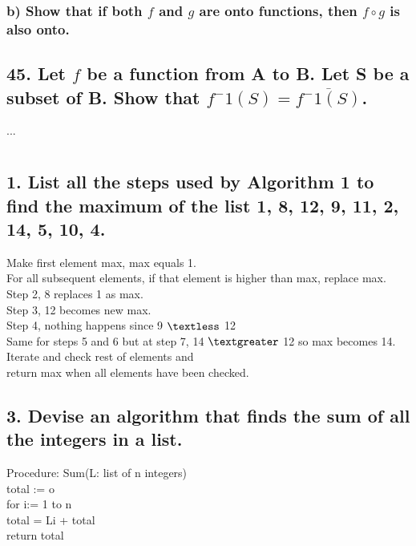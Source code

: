 \documentclass[11pt, oneside]{article} %
\numberwithin{equation}{section} %
\numberwithin{figure}{section} %
\numberwithin{table}{section} %
\begin{document}
\subsubsection{b) Show that if both $f$ and $g$ are onto functions, then $f\circ g$ is also onto.}

\subsection{45. Let $f$ be a function from A to B. Let S be a subset of B. Show that $f^-1(S) = \overline{f^-1(S)}$.}
...

\section{}
\subsection{1. List all the steps used by Algorithm 1 to find the maximum of the list 1, 8, 12, 9, 11, 2, 14, 5, 10, 4.}
Make first element max, max equals 1.\\
For all subsequent elements, if that element is higher than max, replace max.\\
Step 2, 8 replaces 1 as max. \\
Step 3, 12 becomes new max.\\
Step 4, nothing happens since 9 $\textless$ 12\\
Same for steps 5 and 6 but at step 7, 14 $\textgreater$ 12 so max becomes 14.\\
Iterate and check rest of elements and \\
return max when all elements have been checked.


\subsection{3. Devise an algorithm that finds the sum of all the integers in a list.}
Procedure: Sum(L: list of n integers)\\
total := o\\
for i:= 1 to n\\
total = Li + total\\
return total
\end{document}
